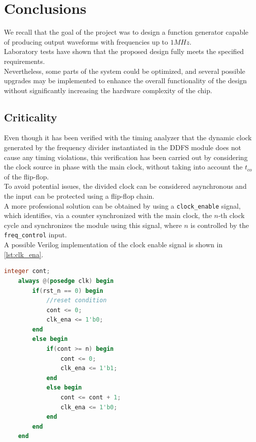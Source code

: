 \section{Conclusions}
\label{sec:conclusions}

We recall that the goal of the project was to design a function generator capable of producing output waveforms with frequencies up to \(1 MHz\). \\
Laboratory tests have shown that the proposed design fully meets the specified requirements. \\
Nevertheless, some parts of the system could be optimized, and several possible upgrades may be implemented to enhance the overall functionality of the design without significantly increasing the hardware complexity of the chip.

\subsection{Criticality}
Even though it has been verified with the timing analyzer that the dynamic clock generated by the frequency divider instantiated in the DDFS module does not cause any timing violations, this verification has been carried out by considering the clock source in phase with the main clock, without taking into account the \(t_{co}\) of the flip-flop. \\
To avoid potential issues, the divided clock can be considered asynchronous and the input can be protected using a flip-flop chain. \\
A more professional solution can be obtained by using a \texttt{clock\_enable} signal, which identifies, via a counter synchronized with the main clock, the \(n\)-th clock cycle and synchronizes the module using this signal, where \(n\) is controlled by the \texttt{freq\_control} input. \\
A possible Verilog implementation of the clock enable signal is shown in \autoref{lst:clk_ena}.

\vspace{0.5cm}
\begin{lstlisting}[language=Verilog, caption=Implementation of clock enable signal with frequency divider, 
label=lst:clk_ena ]
    integer cont;
    always @(posedge clk) begin
        if(rst_n == 0) begin
            //reset condition
            cont <= 0;
            clk_ena <= 1'b0;
        end
        else begin
            if(cont >= n) begin
                cont <= 0;
                clk_ena <= 1'b1;
            end
            else begin
                cont <= cont + 1;
                clk_ena <= 1'b0;
            end
        end
    end
\end{lstlisting}
\vspace{0.5cm}

